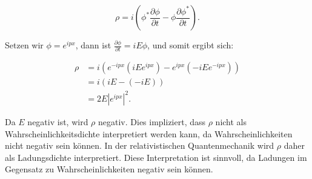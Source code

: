 \[
\rho = i\left(\phi^* \frac{\partial \phi}{\partial t} - \phi \frac{\partial \phi^*}{\partial t}\right).
\]

Setzen wir \(\phi = e^{i p x}\), dann ist \(\frac{\partial \phi}{\partial t} = i E \phi\), und somit ergibt sich:

\[
\begin{align*}
\rho &= i\left(e^{-i p x} (i E e^{i p x}) - e^{i p x} (-i E e^{-i p x})\right) \\
&= i\left(i E - (-i E)\right) \\
&= 2 E |e^{i p x}|^2.
\end{align*}
\]

Da \(E\) negativ ist, wird \(\rho\) negativ. Dies impliziert, dass \(\rho\) nicht als Wahrscheinlichkeitsdichte interpretiert werden kann, da Wahrscheinlichkeiten nicht negativ sein können. In der relativistischen Quantenmechanik wird \(\rho\) daher als Ladungsdichte interpretiert. Diese Interpretation ist sinnvoll, da Ladungen im Gegensatz zu Wahrscheinlichkeiten negativ sein können.

